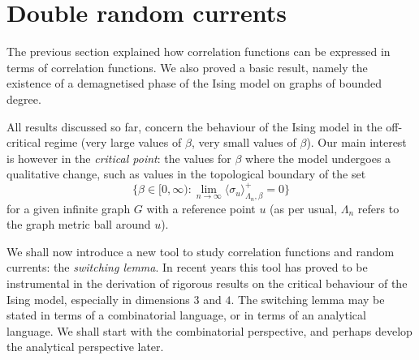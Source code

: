 \section{Double random currents}

The previous section explained how correlation functions can be expressed
in terms of correlation functions.
We also proved a basic result, namely the existence of a demagnetised phase
of the Ising model on graphs of bounded degree.

All results discussed so far, concern the behaviour of the Ising model
in the off-critical regime (very large values of $\beta$, very small values of $\beta$).
Our main interest is however in the \emph{critical point}:
the values for $\beta$ where the model undergoes a qualitative change,
such as values in the topological boundary of the set
\[
    \{\beta\in[0,\infty):\lim_{n\to\infty}\langle\sigma_u\rangle_{\Lambda_n,\beta}^+=0\}
\]
for a given infinite graph $G$ with a reference point $u$
(as per usual, $\Lambda_n$ refers to the graph metric ball around $u$).

We shall now introduce a new tool to study correlation functions
and random currents: the \emph{switching lemma}.
In recent years this tool has proved to be instrumental in the derivation
of rigorous results on the critical
behaviour of the Ising model, especially in dimensions $3$ and $4$.
The switching lemma may be stated in terms of a combinatorial language,
or in terms of an analytical language.
We shall start with the combinatorial perspective,
and perhaps develop the analytical perspective later.

